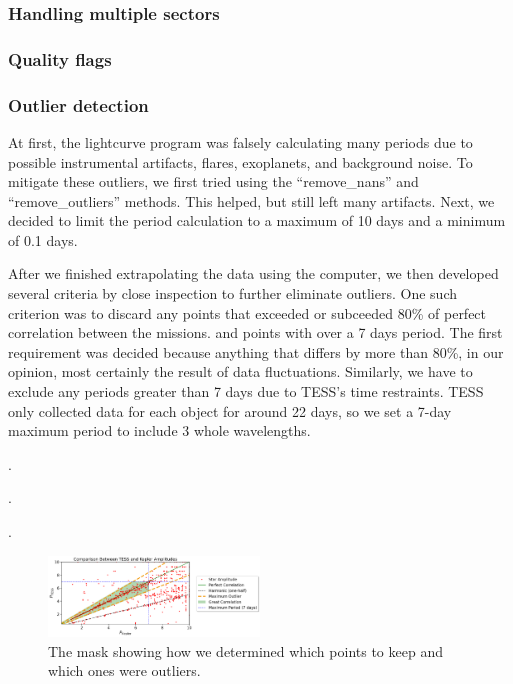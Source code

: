 \documentclass[twocolumn]{aastex631}
\begin{document}
\subsubsection{Handling multiple sectors}

\subsubsection{Quality flags}

\subsubsection{Outlier detection}

At first, the lightcurve program was falsely calculating many periods due to possible instrumental artifacts, flares, exoplanets, and background noise. To mitigate these outliers, we first tried using the \enquote{remove\_nans} and \enquote{remove\_outliers} methods. This helped, but still left many artifacts. Next, we decided to limit the period calculation to a maximum of 10 days and a minimum of 0.1 days.

After we finished extrapolating the data using the computer, we then developed several criteria by close inspection to further eliminate outliers. One such criterion was to discard any points that exceeded or subceeded 80\% of perfect correlation between the missions. and points with over a 7 days period. The first requirement was decided because anything that differs by more than 80\%, in our opinion, most certainly the result of data fluctuations. Similarly, we have to exclude any periods greater than 7 days due to TESS's time restraints. TESS only collected data for each object for around 22 days, so we set a 7-day maximum period to include 3 whole wavelengths.


.

.

.

\begin{figure}[!htb]
  \centering
  \includegraphics[width=0.5\textwidth]{Amplitude Comparison Mask.png}
  \caption{The mask showing how we determined which points to keep and which ones were outliers.}
\end{figure}
\FloatBarrier
\end{document}
